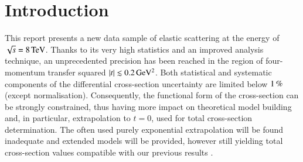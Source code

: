 \section{Introduction}

This report presents a new data sample of elastic scattering at the energy of $\sqrt s = 8\,{\rm TeV}$. Thanks to its very high statistics and an improved analysis technique, an unprecedented precision has been reached in the region of four-momentum transfer squared $|t| \lesssim 0.2\,{\rm GeV^2}$. Both statistical and systematic components of the differential cross-section uncertainty are limited below $1\,{\rm \%}$ (except normalisation). Consequently, the functional form of the cross-section can be strongly constrained, thus having more impact on theoretical model building and, in particular, extrapolation to $t=0$, used for total cross-section determination. The often used purely exponential extrapolation will be found inadequate and extended models will be provided, however still yielding total cross-section values compatible with our previous results \cite{prl111}.




